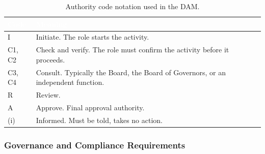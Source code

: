 \begin{table}[h]
\centering
\caption{Authority code notation used in the DAM.}
\label{tab:codes}
\begin{tabular}{|p{}|p{}|}
\hline
\rowcolor{myblue}\textcolor{white}{\textbf{Code}} & \textcolor{white}{\textbf{Meaning}} \\
\hline
I & Initiate. The role starts the activity. \\ \hline
C1, C2 & Check and verify. The role must confirm the activity before it proceeds. \\ \hline
C3, C4 & Consult. Typically the Board, the Board of Governors, or an independent function. \\ \hline
R & Review. \\ \hline
A & Approve. Final approval authority. \\ \hline
(i) & Informed. Must be told, takes no action. \\ \hline
\end{tabular}
\end{table}


\subsubsection{Governance and Compliance Requirements}


